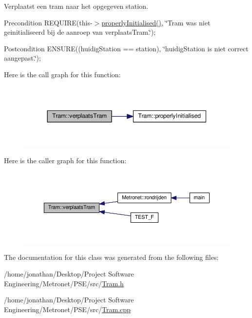 Verplaatst een tram naar het opgegeven station. 

\begin{DoxyPrecond}{Precondition}
R\+E\+Q\+U\+I\+RE(this-\/$>$\hyperlink{class_tram_a98992eff0453f54fbe64e1f1064169c7}{properly\+Initialised()}, \char`\"{}\+Tram was niet geinitialiseerd bij de aanroep van verplaats\+Tram.\char`\"{}); 
\end{DoxyPrecond}
\begin{DoxyPostcond}{Postcondition}
E\+N\+S\+U\+RE((huidig\+Station == station), \char`\"{}huidig\+Station is niet correct aangepast.\char`\"{}); 
\end{DoxyPostcond}


Here is the call graph for this function\+:\nopagebreak
\begin{figure}[H]
\begin{center}
\leavevmode
\includegraphics[width=344pt]{class_tram_a8d55296c7ede4aa92c9b3a4b2a9495a8_cgraph}
\end{center}
\end{figure}




Here is the caller graph for this function\+:\nopagebreak
\begin{figure}[H]
\begin{center}
\leavevmode
\includegraphics[width=350pt]{class_tram_a8d55296c7ede4aa92c9b3a4b2a9495a8_icgraph}
\end{center}
\end{figure}




The documentation for this class was generated from the following files\+:\begin{DoxyCompactItemize}
\item 
/home/jonathan/\+Desktop/\+Project Software Engineering/\+Metronet/\+P\+S\+E/src/\hyperlink{_tram_8h}{Tram.\+h}\item 
/home/jonathan/\+Desktop/\+Project Software Engineering/\+Metronet/\+P\+S\+E/src/\hyperlink{_tram_8cpp}{Tram.\+cpp}\end{DoxyCompactItemize}
